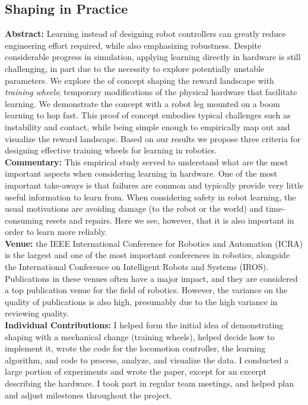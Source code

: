 \subsection{Shaping in Practice}
\textbf{Abstract: }
Learning instead of designing robot controllers can greatly reduce engineering effort required, while also emphasizing robustness. Despite considerable progress in simulation, applying learning directly in hardware is still challenging, in part due to the necessity to explore potentially unstable parameters. We explore the of concept shaping the reward landscape with \emph{training wheels}; temporary modifications of the physical hardware that facilitate learning. We demonstrate the concept with a robot leg mounted on a boom learning to hop fast. This proof of concept embodies typical challenges such as instability and contact, while being simple enough to empirically map out and visualize the reward landscape. Based on our results we propose three criteria for designing effective training wheels for learning in robotics. \\
\textbf{Commentary: }
This empirical study served to understand what are the most important aspects when considering learning in hardware. One of the most important take-aways is that failures are common and typically provide very little useful information to learn from. When considering safety in robot learning, the usual motivations are avoiding damage (to the robot or the world) and time-consuming resets and repairs. Here we see, however, that it is also important in order to learn more reliably. \\
\textbf{Venue: }
the IEEE International Conference for Robotics and Automation (ICRA) is the largest and one of the most important conferences in robotics, alongside the International Conference on Intelligent Robots and Systems (IROS). Publications in these venues often have a major impact, and they are considered a top publication venue for the field of robotics. However, the variance on the quality of publications is also high, presumably due to the high variance in reviewing quality. \\
\textbf{Individual Contributions: }
I helped form the initial idea of demonstrating shaping with a mechanical change (training wheels), helped decide how to implement it, wrote the code for the locomotion controller, the learning algorithm, and code to process, analyze, and visualize the data. I conducted a large portion of experiments and wrote the paper, except for an excerpt describing the hardware. I took part in regular team meetings, and helped plan and adjust milestones throughout the project.
